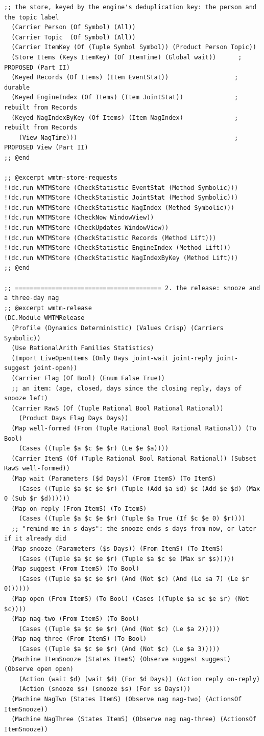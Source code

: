 \documentclass[11pt]{article}
\theoremstyle{definition}
\theoremstyle{plain}
\begin{document}
\begin{lstlisting}[style=mettafull]
  ;; the store, keyed by the engine's deduplication key: the person and the topic label
  (Carrier Person (Of Symbol) (All))
  (Carrier Topic  (Of Symbol) (All))
  (Carrier ItemKey (Of (Tuple Symbol Symbol)) (Product Person Topic))
  (Store Items (Keys ItemKey) (Of ItemTime) (Global wait))      ; PROPOSED (Part II)
  (Keyed Records (Of Items) (Item EventStat))                  ; durable
  (Keyed EngineIndex (Of Items) (Item JointStat))              ; rebuilt from Records
  (Keyed NagIndexByKey (Of Items) (Item NagIndex)              ; rebuilt from Records
    (View NagTime)))                                           ; PROPOSED View (Part II)
;; @end

;; @excerpt wmtm-store-requests
!(dc.run WMTMStore (CheckStatistic EventStat (Method Symbolic)))
!(dc.run WMTMStore (CheckStatistic JointStat (Method Symbolic)))
!(dc.run WMTMStore (CheckStatistic NagIndex (Method Symbolic)))
!(dc.run WMTMStore (CheckNow WindowView))
!(dc.run WMTMStore (CheckUpdates WindowView))
!(dc.run WMTMStore (CheckStatistic Records (Method Lift)))
!(dc.run WMTMStore (CheckStatistic EngineIndex (Method Lift)))
!(dc.run WMTMStore (CheckStatistic NagIndexByKey (Method Lift)))
;; @end

;; ======================================== 2. the release: snooze and a three-day nag
;; @excerpt wmtm-release
(DC.Module WMTMRelease
  (Profile (Dynamics Deterministic) (Values Crisp) (Carriers Symbolic))
  (Use RationalArith Families Statistics)
  (Import LiveOpenItems (Only Days joint-wait joint-reply joint-suggest joint-open))
  (Carrier Flag (Of Bool) (Enum False True))
  ;; an item: (age, closed, days since the closing reply, days of snooze left)
  (Carrier RawS (Of (Tuple Rational Bool Rational Rational))
    (Product Days Flag Days Days))
  (Map well-formed (From (Tuple Rational Bool Rational Rational)) (To Bool)
    (Cases ((Tuple $a $c $e $r) (Le $e $a))))
  (Carrier ItemS (Of (Tuple Rational Bool Rational Rational)) (Subset RawS well-formed))
  (Map wait (Parameters ($d Days)) (From ItemS) (To ItemS)
    (Cases ((Tuple $a $c $e $r) (Tuple (Add $a $d) $c (Add $e $d) (Max 0 (Sub $r $d))))))
  (Map on-reply (From ItemS) (To ItemS)
    (Cases ((Tuple $a $c $e $r) (Tuple $a True (If $c $e 0) $r))))
  ;; "remind me in s days": the snooze ends s days from now, or later if it already did
  (Map snooze (Parameters ($s Days)) (From ItemS) (To ItemS)
    (Cases ((Tuple $a $c $e $r) (Tuple $a $c $e (Max $r $s)))))
  (Map suggest (From ItemS) (To Bool)
    (Cases ((Tuple $a $c $e $r) (And (Not $c) (And (Le $a 7) (Le $r 0))))))
  (Map open (From ItemS) (To Bool) (Cases ((Tuple $a $c $e $r) (Not $c))))
  (Map nag-two (From ItemS) (To Bool)
    (Cases ((Tuple $a $c $e $r) (And (Not $c) (Le $a 2)))))
  (Map nag-three (From ItemS) (To Bool)
    (Cases ((Tuple $a $c $e $r) (And (Not $c) (Le $a 3)))))
  (Machine ItemSnooze (States ItemS) (Observe suggest suggest) (Observe open open)
    (Action (wait $d) (wait $d) (For $d Days)) (Action reply on-reply)
    (Action (snooze $s) (snooze $s) (For $s Days)))
  (Machine NagTwo (States ItemS) (Observe nag nag-two) (ActionsOf ItemSnooze))
  (Machine NagThree (States ItemS) (Observe nag nag-three) (ActionsOf ItemSnooze))


\end{lstlisting}
\end{document}
